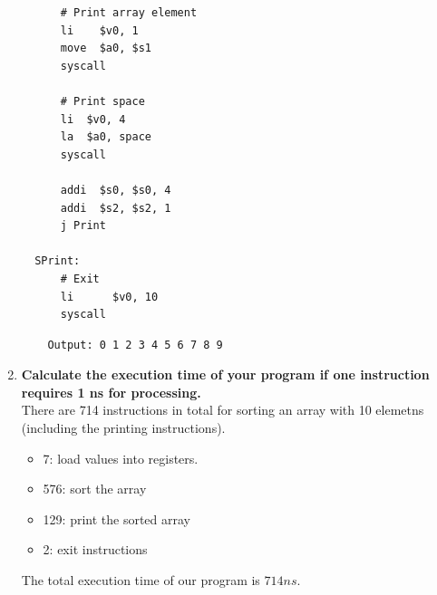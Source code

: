 \documentclass[12pt,a4paper]{article}
\begin{document}
\begin{enumerate}
\begin{mdframed}[hidealllines=true,backgroundcolor=magenta!10]
\begin{lstlisting}
      # Print array element
      li    $v0, 1
      move  $a0, $s1
      syscall

      # Print space
      li  $v0, 4
      la  $a0, space
      syscall

      addi  $s0, $s0, 4
      addi  $s2, $s2, 1
      j Print

  SPrint:
      # Exit
      li      $v0, 10
      syscall

          \end{lstlisting}
        \end{mdframed}


        \begin{mdframed}[hidealllines=true,backgroundcolor=magenta!10]
          \begin{lstlisting}
    Output: 0 1 2 3 4 5 6 7 8 9
         \end{lstlisting}
        \end{mdframed}
  \item \textbf{Calculate the execution time of your program if one instruction requires 1 ns for processing.} \\

        There are 714 instructions in total for sorting an array with 10 elemetns (including the printing instructions).

        \begin{itemize}
          \item 7: load values into registers.
          \item 576: sort the array
          \item 129: print the sorted array
          \item 2: exit instructions
        \end{itemize}

        The total execution time of our program is \(714 ns\).

\end{enumerate}

\newpage
{}
\end{document}
